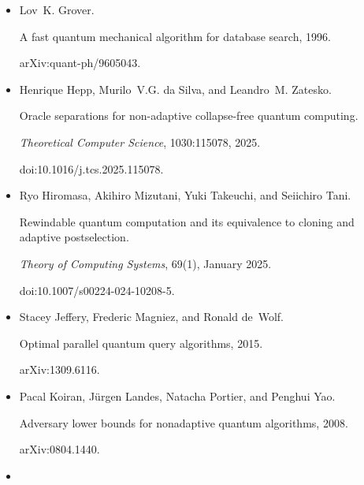\begin{itemize}
doi:10.48550/arXiv.2311.16057.





\item[] 
[19]

Lov K. Grover.


A fast quantum mechanical algorithm for database search, 1996.


arXiv:quant-ph/9605043.





\item[] 
[20]

Henrique Hepp, Murilo V.G. da Silva, and Leandro M. Zatesko.


Oracle separations for non-adaptive collapse-free quantum computing.


\emph{Theoretical Computer Science}, 1030:115078, 2025.


doi:10.1016/j.tcs.2025.115078.





\item[] 
[21]

Ryo Hiromasa, Akihiro Mizutani, Yuki Takeuchi, and Seiichiro Tani.


Rewindable quantum computation and its equivalence to cloning and
adaptive postselection.


\emph{Theory of Computing Systems}, 69(1), January 2025.


doi:10.1007/s00224-024-10208-5.





\item[] 
[22]

Stacey Jeffery, Frederic Magniez, and Ronald de Wolf.


Optimal parallel quantum query algorithms, 2015.


arXiv:1309.6116.





\item[] 
[23]

Pacal Koiran, Jürgen Landes, Natacha Portier, and Penghui Yao.


Adversary lower bounds for nonadaptive quantum algorithms, 2008.


arXiv:0804.1440.





\item[] 
[24]


\end{itemize}
